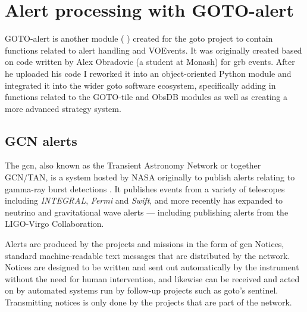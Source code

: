 \begin{colsection}
\begin{colsection}
\end{colsection}


\end{colsection}


\newpage
\section{Alert processing with GOTO-alert}
\label{sec:gotoalert}
\begin{colsection}


\begin{colsection}

GOTO-alert is another  module ( ) created for the \gls{goto} project to contain functions related to alert handling and VOEvents. It was originally created based on code written by Alex Obradovic (a student at Monash) for \gls{grb} events. After he uploaded his code I reworked it into an object-oriented Python module and integrated it into the wider \gls{goto} software ecosystem, specifically adding in functions related to the GOTO-tile and ObsDB modules as well as creating a more advanced strategy system.

\end{colsection}


\subsection{GCN alerts}
\label{sec:gcn}
\begin{colsection}

The \gls{gcn}, also known as the Transient Astronomy Network or together GCN/TAN, is a system hosted by NASA originally to publish alerts relating to gamma-ray burst detections \citep{GCN}. It publishes events from a variety of telescopes including \textit{INTEGRAL}, \textit{Fermi} and \textit{Swift}, and more recently has expanded to neutrino and gravitational wave alerts --- including publishing alerts from the LIGO-Virgo Collaboration.

Alerts are produced by the projects and missions in the form of \gls{gcn} Notices, standard machine-readable text messages that are distributed by the network. Notices are designed to be written and sent out automatically by the instrument without the need for human intervention, and likewise can be received and acted on by automated systems run by follow-up projects such as \gls{goto}'s sentinel. Transmitting notices is only done by the projects that are part of the network.


\end{colsection}
\end{colsection}
